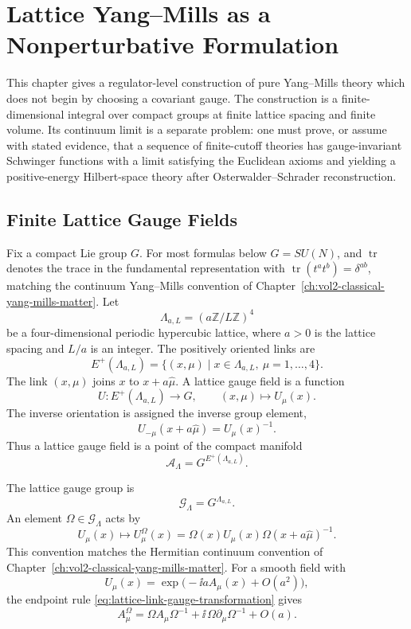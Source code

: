 \chapter{Lattice Yang--Mills as a Nonperturbative Formulation}
\label{ch:lattice-yang-mills-nonperturbative-definition}
\ConventionsEuclidean

This chapter gives a regulator-level construction of pure Yang--Mills theory
which does not begin by choosing a covariant gauge.  The construction is a
finite-dimensional integral over compact groups at finite lattice spacing and
finite volume.  Its continuum limit is a separate problem: one must prove, or
assume with stated evidence, that a sequence of finite-cutoff theories has
gauge-invariant Schwinger functions with a limit satisfying the Euclidean
axioms and yielding a positive-energy Hilbert-space theory after
Osterwalder--Schrader reconstruction.

\section{Finite Lattice Gauge Fields}

Fix a compact Lie group \(G\).  For most formulas below \(G=SU(N)\), and
\(\operatorname{tr}\) denotes the trace in the fundamental representation with
\(\operatorname{tr}(t^a t^b)=\delta^{ab}\), matching the continuum
Yang--Mills convention of
Chapter~\ref{ch:vol2-classical-yang-mills-matter}.  Let
\[
  \Lambda_{a,L}
  =
  (a\mathbb Z/L\mathbb Z)^4
\]
be a four-dimensional periodic hypercubic lattice, where \(a>0\) is the
lattice spacing and \(L/a\) is an integer.  The positively oriented links are
\[
  E^+(\Lambda_{a,L})
  =
  \{(x,\mu)\mid x\in\Lambda_{a,L},\ \mu=1,\ldots,4\}.
\]
The link \((x,\mu)\) joins \(x\) to \(x+a\widehat\mu\).  A lattice gauge field
is a function
\[
  U:E^+(\Lambda_{a,L})\longrightarrow G,
  \qquad
  (x,\mu)\longmapsto U_\mu(x).
\]
The inverse orientation is assigned the inverse group element,
\[
  U_{-\mu}(x+a\widehat\mu)=U_\mu(x)^{-1}.
\]
Thus a lattice gauge field is a point of the compact manifold
\[
  \mathcal A_{\Lambda}=G^{E^+(\Lambda_{a,L})}.
\]

The lattice gauge group is
\[
  \mathcal G_{\Lambda}=G^{\Lambda_{a,L}}.
\]
An element \(\Omega\in\mathcal G_{\Lambda}\) acts by
\begin{equation}
  U_\mu(x)\longmapsto
  U^\Omega_\mu(x)
  =
  \Omega(x)U_\mu(x)\Omega(x+a\widehat\mu)^{-1}.
  \label{eq:lattice-link-gauge-transformation}
\end{equation}
This convention matches the Hermitian continuum convention of
Chapter~\ref{ch:vol2-classical-yang-mills-matter}.  For a smooth field with
\[
  U_\mu(x)=\exp\bigl(-\ii a A_\mu(x)+O(a^2)\bigr),
\]
the endpoint rule \eqref{eq:lattice-link-gauge-transformation} gives
\[
  A_\mu^\Omega
  =
  \Omega A_\mu\Omega^{-1}
  +
  \ii\,\Omega\partial_\mu\Omega^{-1}
  +O(a).
\]

